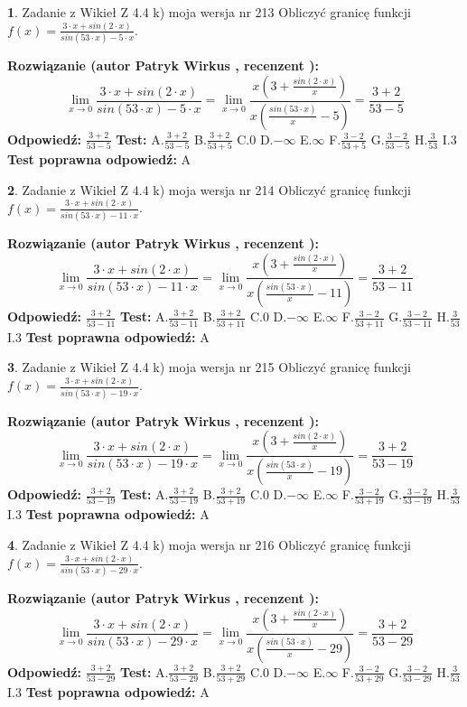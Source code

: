 \documentclass[12pt, a4paper]{article}
\theoremstyle{definition} %
\newtheorem{zad}{}
\newcommand{\zadStart}[1]{\begin{zad}#1\newline}
\newcommand{\zadStop}{\end{zad}}
\newcommand{\rozwStart}[2]{\noindent \textbf{Rozwiązanie (autor #1 , recenzent #2): }\newline}
\newcommand{\rozwStop}{\newline}
\newcommand{\odpStart}{\noindent \textbf{Odpowiedź:}\newline}
\newcommand{\odpStop}{\newline}
\newcommand{\testStart}{\noindent \textbf{Test:}\newline}
\newcommand{\testStop}{\newline}
\newcommand{\kluczStart}{\noindent \textbf{Test poprawna odpowiedź:}\newline}
\newcommand{\kluczStop}{\newline}
\begin{document}
\zadStart{Zadanie z Wikieł Z 4.4 k) moja wersja nr 213}
Obliczyć granicę funkcji $f(x)=\frac{3\cdot x +sin(2\cdot x)}{sin(53\cdot x) -5\cdot x}$.
\zadStop
\rozwStart{Patryk Wirkus}{}
$$\lim\limits_{x\to 0}\frac{3\cdot x +sin(2\cdot x)}{sin(53\cdot x) -5\cdot x}
=\lim\limits_{x\to 0}\frac{x(3+\frac{sin(2\cdot x)}{x})}{x(\frac{sin(53\cdot x)}{x}-5)}
=\frac{3+2}{53-5}$$
\rozwStop
\odpStart
$\frac{3+2}{53-5}$
\odpStop
\testStart
A.$\frac{3+2}{53-5}$
B.$\frac{3+2}{53+5}$
C.$0$
D.$-\infty$
E.$\infty$
F.$\frac{3-2}{53+5}$
G.$\frac{3-2}{53-5}$
H.$\frac{3}{53}$
I.$3$
\testStop
\kluczStart
A
\kluczStop



\zadStart{Zadanie z Wikieł Z 4.4 k) moja wersja nr 214}
Obliczyć granicę funkcji $f(x)=\frac{3\cdot x +sin(2\cdot x)}{sin(53\cdot x) -11\cdot x}$.
\zadStop
\rozwStart{Patryk Wirkus}{}
$$\lim\limits_{x\to 0}\frac{3\cdot x +sin(2\cdot x)}{sin(53\cdot x) -11\cdot x}
=\lim\limits_{x\to 0}\frac{x(3+\frac{sin(2\cdot x)}{x})}{x(\frac{sin(53\cdot x)}{x}-11)}
=\frac{3+2}{53-11}$$
\rozwStop
\odpStart
$\frac{3+2}{53-11}$
\odpStop
\testStart
A.$\frac{3+2}{53-11}$
B.$\frac{3+2}{53+11}$
C.$0$
D.$-\infty$
E.$\infty$
F.$\frac{3-2}{53+11}$
G.$\frac{3-2}{53-11}$
H.$\frac{3}{53}$
I.$3$
\testStop
\kluczStart
A
\kluczStop



\zadStart{Zadanie z Wikieł Z 4.4 k) moja wersja nr 215}
Obliczyć granicę funkcji $f(x)=\frac{3\cdot x +sin(2\cdot x)}{sin(53\cdot x) -19\cdot x}$.
\zadStop
\rozwStart{Patryk Wirkus}{}
$$\lim\limits_{x\to 0}\frac{3\cdot x +sin(2\cdot x)}{sin(53\cdot x) -19\cdot x}
=\lim\limits_{x\to 0}\frac{x(3+\frac{sin(2\cdot x)}{x})}{x(\frac{sin(53\cdot x)}{x}-19)}
=\frac{3+2}{53-19}$$
\rozwStop
\odpStart
$\frac{3+2}{53-19}$
\odpStop
\testStart
A.$\frac{3+2}{53-19}$
B.$\frac{3+2}{53+19}$
C.$0$
D.$-\infty$
E.$\infty$
F.$\frac{3-2}{53+19}$
G.$\frac{3-2}{53-19}$
H.$\frac{3}{53}$
I.$3$
\testStop
\kluczStart
A
\kluczStop



\zadStart{Zadanie z Wikieł Z 4.4 k) moja wersja nr 216}
Obliczyć granicę funkcji $f(x)=\frac{3\cdot x +sin(2\cdot x)}{sin(53\cdot x) -29\cdot x}$.
\zadStop
\rozwStart{Patryk Wirkus}{}
$$\lim\limits_{x\to 0}\frac{3\cdot x +sin(2\cdot x)}{sin(53\cdot x) -29\cdot x}
=\lim\limits_{x\to 0}\frac{x(3+\frac{sin(2\cdot x)}{x})}{x(\frac{sin(53\cdot x)}{x}-29)}
=\frac{3+2}{53-29}$$
\rozwStop
\odpStart
$\frac{3+2}{53-29}$
\odpStop
\testStart
A.$\frac{3+2}{53-29}$
B.$\frac{3+2}{53+29}$
C.$0$
D.$-\infty$
E.$\infty$
F.$\frac{3-2}{53+29}$
G.$\frac{3-2}{53-29}$
H.$\frac{3}{53}$
I.$3$
\testStop
\kluczStart
A
\kluczStop
\end{document}
